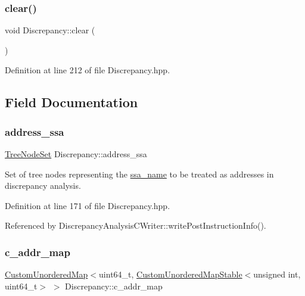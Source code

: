 \subsubsection{\texorpdfstring{clear()}{clear()}}
{\footnotesize\ttfamily void Discrepancy\+::clear (\begin{DoxyParamCaption}{ }\end{DoxyParamCaption})\hspace{0.3cm}{\ttfamily [inline]}}



Definition at line 212 of file Discrepancy.\+hpp.



\subsection{Field Documentation}
\mbox{\label{structDiscrepancy_aefe1a7cac365946d3357a5e9c771506e}} 
\subsubsection{\texorpdfstring{address\+\_\+ssa}{address\_ssa}}
{\footnotesize\ttfamily \hyperlink{classTreeNodeSet}{Tree\+Node\+Set} Discrepancy\+::address\+\_\+ssa}



Set of tree nodes representing the \hyperlink{structssa__name}{ssa\+\_\+name} to be treated as addresses in discrepancy analysis. 



Definition at line 171 of file Discrepancy.\+hpp.



Referenced by Discrepancy\+Analysis\+C\+Writer\+::write\+Post\+Instruction\+Info().

\mbox{\label{structDiscrepancy_a225dda03d26685febf8c24f7fd77e420}} 
\subsubsection{\texorpdfstring{c\+\_\+addr\+\_\+map}{c\_addr\_map}}
{\footnotesize\ttfamily \hyperlink{custom__map_8hpp_ad1ed68f2ff093683ab1a33522b144adc}{Custom\+Unordered\+Map}$<$uint64\+\_\+t, \hyperlink{custom__map_8hpp_a7314a7df1cdb3a3acf478ab86e95c226}{Custom\+Unordered\+Map\+Stable}$<$unsigned int, uint64\+\_\+t$>$ $>$ Discrepancy\+::c\+\_\+addr\+\_\+map}



